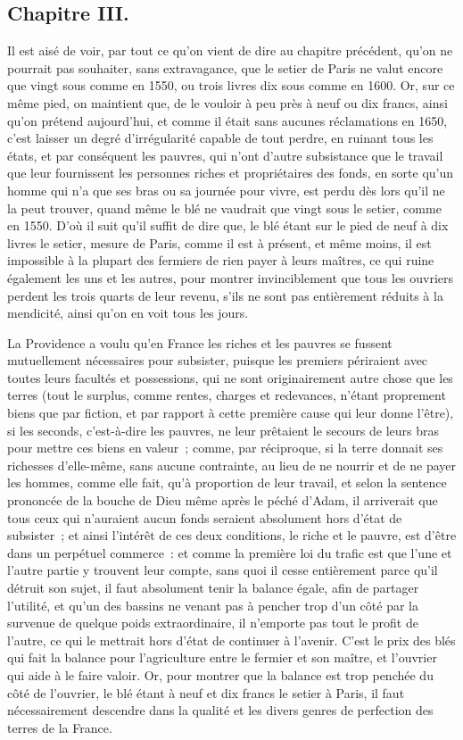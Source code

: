 \documentclass[french,twoside]{book} %
\begin{document}
\subsection[{Chapitre III.}]{Chapitre III.}
\noindent Il est aisé de voir, par tout ce qu’on vient de dire au chapitre précédent, qu’on ne pourrait pas souhaiter, sans extravagance, que le setier de Paris ne valut encore que vingt sous comme en 1550, ou trois livres dix sous comme en 1600. Or, sur ce même pied, on maintient que, de le vouloir à peu près à neuf ou dix francs, ainsi qu’on prétend aujourd’hui, et comme il était sans aucunes réclamations en 1650, c’est laisser un degré d’irrégularité capable de tout perdre, en ruinant tous les états, et par conséquent les pauvres, qui n’ont d’autre subsistance que le travail que leur fournissent les personnes riches et propriétaires des fonds, en sorte qu’un homme qui n’a que ses bras ou sa journée pour vivre, est perdu dès lors qu’il ne la peut trouver, quand même le blé ne vaudrait que vingt sous le setier, comme en 1550. D’où il suit qu’il suffit de dire que, le blé étant sur le pied de neuf à dix livres le setier, mesure de Paris, comme il est à présent, et même moins, il est impossible à la plupart des fermiers de rien payer à leurs maîtres, ce qui ruine également les uns et les autres, pour montrer invinciblement que tous les ouvriers perdent les trois quarts de leur revenu, s’ils ne sont pas entièrement réduits à la mendicité, ainsi qu’on en voit tous les jours.\par
La Providence a voulu qu’en France les riches et les pauvres se fussent mutuellement nécessaires pour subsister, puisque les premiers périraient avec toutes leurs facultés et possessions, qui ne sont originairement autre chose que les terres (tout le surplus, comme rentes, charges et redevances, n’étant proprement biens que par fiction, et par rapport à cette première cause qui leur donne l’être), si les seconds, c’est-à-dire les pauvres, ne leur prêtaient le secours de leurs bras pour mettre ces biens en valeur ; comme, par réciproque, si la terre donnait ses richesses d’elle-même, sans aucune contrainte, au lieu de ne nourrir et de ne payer les hommes, comme elle fait, qu’à proportion de leur travail, et selon la sentence prononcée de la bouche de Dieu même après le péché d’Adam, il arriverait que tous ceux qui n’auraient aucun fonds seraient absolument hors d’état de subsister ; et ainsi l’intérêt de ces deux conditions, le riche et le pauvre, est d’être dans un perpétuel commerce : et comme la première loi du trafic est que l’une et l’autre partie y trouvent leur compte, sans quoi il cesse entièrement parce qu’il détruit son sujet, il faut absolument tenir la balance égale, afin de partager l’utilité, et qu’un des bassins ne venant pas à pencher trop d’un côté par la survenue de quelque poids extraordinaire, il n’emporte pas tout le profit de l’autre, ce qui le mettrait hors d’état de continuer à l’avenir. C’est le prix des blés qui fait la balance pour l’agriculture entre le fermier et son maître, et l’ouvrier qui aide à le faire valoir. Or, pour montrer que la balance est trop penchée du côté de l’ouvrier, le blé étant à neuf et dix francs le setier à Paris, il faut nécessairement descendre dans la qualité et les divers genres de perfection des terres de la France.\par
\end{document}
